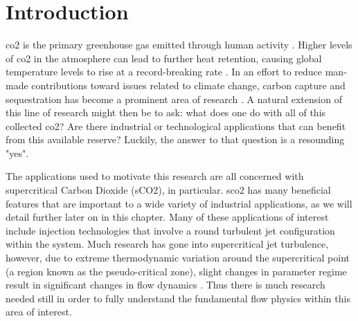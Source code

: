 \chapter{Introduction}

\gls{co2} is the primary greenhouse gas emitted through human activity \cite{Emissions_2023}. Higher levels of \gls{co2} in the atmosphere can lead to further heat retention, causing global temperature levels to rise at a record-breaking rate \cite{Lindsey_2023,}. In an effort to reduce man-made contributions toward issues related to climate change, carbon capture and sequestration has become a prominent area of research \cite{}. A natural extension of this line of research might then be to ask: what does one do with all of this collected \gls{co2}? Are there industrial or technological applications that can benefit from this available reserve? Luckily, the answer to that question is a resounding "yes".


The applications used to motivate this research are all concerned with supercritical Carbon Dioxide (sCO2), in particular. \gls{sco2} has many beneficial features that are important to a wide variety of industrial applications, as we will detail further later on in this chapter. Many of these applications of interest include injection technologies that involve a round turbulent jet configuration within the system. Much research has gone into supercritical jet turbulence, however, due to extreme thermodynamic variation around the supercritical point (a region known as the pseudo-critical zone), slight changes in parameter regime result in significant changes in flow dynamics \cite{}. Thus there is much research needed still in order to fully understand the fundamental flow physics within this area of interest. 

